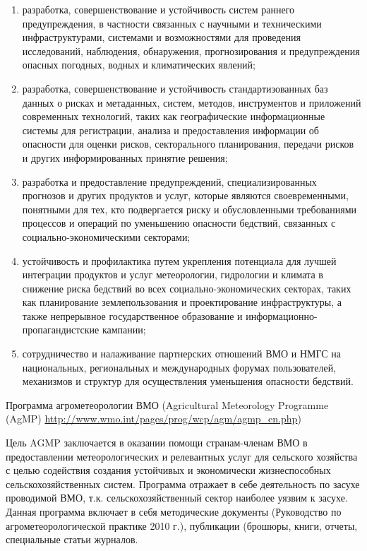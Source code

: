 \begin{enumerate}
	\item разработка, совершенствование и устойчивость систем раннего предупреждения, в частности связанных с научными и техническими инфраструктурами, системами и возможностями для проведения исследований, наблюдения, обнаружения, прогнозирования и предупреждения опасных погодных, водных и климатических явлений;
	\item разработка, совершенствование и устойчивость стандартизованных баз данных о рисках и метаданных, систем, методов, инструментов и приложений современных технологий, таких как географические информационные системы для регистрации, анализа и предоставления информации об опасности для оценки рисков, секторального планирования, передачи рисков и других информированных принятие решения;
	\item разработка и предоставление предупреждений, специализированных прогнозов и других продуктов и услуг, которые являются своевременными, понятными для тех, кто подвергается риску и обусловленными требованиями процессов и операций по уменьшению опасности бедствий, связанных с социально-экономическими секторами;
	\item устойчивость и профилактика путем укрепления потенциала для лучшей интеграции продуктов и услуг метеорологии, гидрологии и климата в снижение риска бедствий во всех социально-экономических секторах, таких как планирование землепользования и проектирование инфраструктуры, а также непрерывное государственное образование и информационно-пропагандистские кампании;
	\item сотрудничество и налаживание партнерских отношений ВМО и НМГС на национальных, региональных и международных форумах пользователей, механизмов и структур для осуществления уменьшения опасности бедствий.
\end{enumerate}

Программа агрометеорологии ВМО (Agricultural Meteorology Programme (AgMP) \url{http://www.wmo.int/pages/prog/wcp/agm/agmp_en.php})

Цель AGMP заключается в оказании помощи странам-членам ВМО в предоставлении метеорологических и релевантных услуг для сельского хозяйства с целью содействия создания устойчивых и экономически жизнеспособных сельскохозяйственных систем.
Программа отражает в себе деятельность по засухе проводимой ВМО, т.к. сельскохозяйственный сектор наиболее уязвим к засухе.
Данная программа включает в себя методические документы (Руководство по агрометеорологической практике 2010 г.), публикации (брошюры, книги, отчеты, специальные статьи журналов. 

